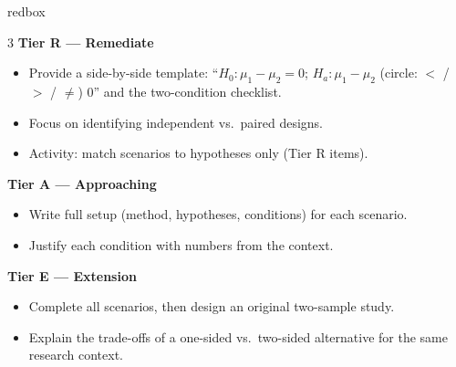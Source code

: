 \documentclass[10pt]{article}
\begin{document}
\begin{skillbox}{redbox}
\begin{multicols}{3}
    \textbf{Tier R --- Remediate}
    \begin{itemize}
        \item Provide a side-by-side template: ``$H_0: \mu_1 - \mu_2 = 0$;
              $H_a: \mu_1 - \mu_2$ (circle: $<$ / $>$ / $\ne$) $0$'' and the
              two-condition checklist.
        \item Focus on identifying independent vs.\ paired designs.
        \item Activity: match scenarios to hypotheses only (Tier R items).
    \end{itemize}
    \columnbreak
    \textbf{Tier A --- Approaching}
    \begin{itemize}
        \item Write full setup (method, hypotheses, conditions) for each scenario.
        \item Justify each condition with numbers from the context.
    \end{itemize}
    \columnbreak
    \textbf{Tier E --- Extension}
    \begin{itemize}
        \item Complete all scenarios, then design an original two-sample study.
        \item Explain the trade-offs of a one-sided vs.\ two-sided alternative for
              the same research context.
    \end{itemize}
\end{multicols}
\end{skillbox}
\end{document}
